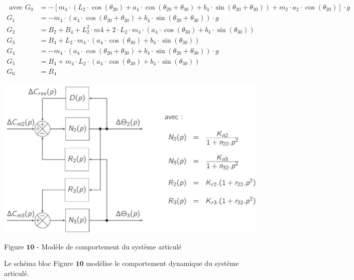 \documentclass[10pt]{article}
\begin{document}
$$
\begin{aligned}
\text { avec } G_{0} & =-\left[m_{4} \cdot\left(L_{2} \cdot \cos \left(\theta_{20}\right)+a_{4} \cdot \cos \left(\theta_{20}+\theta_{30}\right)+b_{4} \cdot \sin \left(\theta_{20}+\theta_{30}\right)\right)+m_{2} \cdot a_{2} \cdot \cos \left(\theta_{20}\right)\right] \cdot g \\
G_{1} & =-m_{4} \cdot\left(a_{4} \cdot \cos \left(\theta_{20}+\theta_{30}\right)+b_{4} \cdot \sin \left(\theta_{20}+\theta_{30}\right)\right) \cdot g \\
G_{2} & =B_{2}+B_{4}+L_{2}^{2} \cdot m 4+2 \cdot L_{2} \cdot m_{4} \cdot\left(a_{4} \cdot \cos \left(\theta_{30}\right)+b_{4} \cdot \sin \left(\theta_{30}\right)\right) \\
G_{3} & =B_{4}+L_{2} \cdot m_{4} \cdot\left(a_{4} \cdot \cos \left(\theta_{30}\right)+b_{4} \cdot \sin \left(\theta_{30}\right)\right) \\
G_{4} & =-m_{4} \cdot\left(a_{4} \cdot \cos \left(\theta_{20}+\theta_{30}\right)+b_{4} \cdot \sin \left(\theta_{20}+\theta_{30}\right)\right) \cdot g \\
G_{5} & =B_{4}+m_{4} \cdot L_{2} \cdot\left(a_{4} \cdot \cos \left(\theta_{30}\right)+b_{4} \cdot \sin \left(\theta_{30}\right)\right) \\
G_{6} & =B_{4}
\end{aligned}
$$

\begin{center}
\includegraphics[max width=\textwidth]{2023_11_27_dfbf12e0af72c49ac6a4g-12(1)}
\end{center}

Figure $\mathbf{1 0}$ - Modèle de comportement du système articulé

Le schéma bloc Figure $\mathbf{1 0}$ modélise le comportement dynamique du système articulé.
\end{document}
